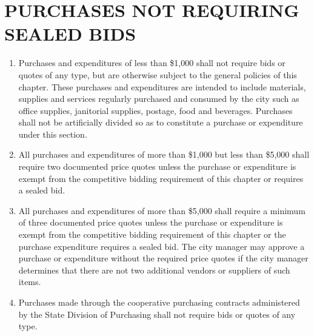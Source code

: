 \pagebreak

\section{PURCHASES NOT REQUIRING SEALED BIDS}
\begin{enumerate}
	\item Purchases and expenditures of less than \$1,000 shall not require bids or quotes of any type, but are otherwise subject to the general policies of this chapter. These purchases and expenditures are intended to include materials, supplies and services regularly purchased and consumed by the city such as office supplies, janitorial supplies, postage, food and beverages. Purchases shall not be artificially divided so as to constitute a purchase or expenditure under this section. 
	\item All purchases and expenditures of more than \$1,000 but less than \$5,000 shall require two documented price quotes unless the purchase or expenditure is exempt from the competitive bidding requirement of this chapter or requires a sealed bid. 
	\item All purchases and expenditures of more than \$5,000 shall require a minimum of three documented price quotes unless the purchase or expenditure is exempt from the competitive bidding requirement of this chapter or the purchase expenditure requires a sealed bid. The city manager may approve a purchase or expenditure without the required price quotes if the city manager determines that there are not two additional vendors or suppliers of such items. 
	\item Purchases made through the cooperative purchasing contracts administered by the State Division of Purchasing shall not require bids or quotes of any type. 
\end{enumerate}

